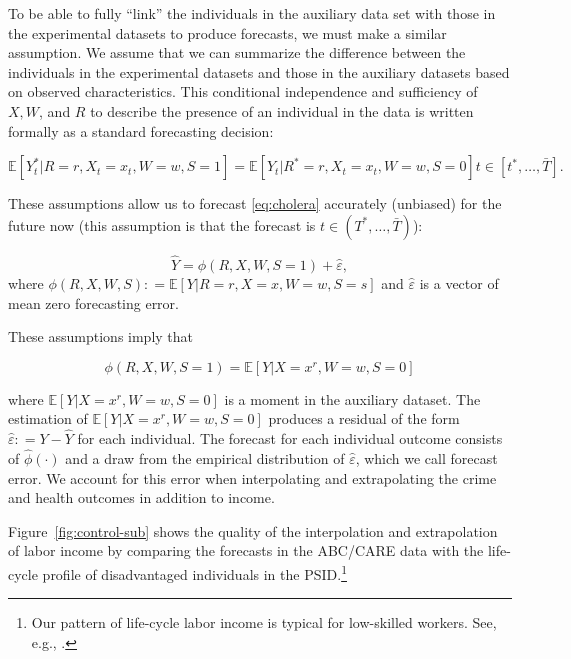 To be able to fully ``link'' the individuals in the auxiliary data set with those in the experimental datasets to produce forecasts, we must make a similar assumption. We assume that we can summarize the difference between the individuals in the experimental datasets and those in the auxiliary datasets based on observed characteristics. This conditional independence and sufficiency of $X, W$, and $R$ to describe the presence of an individual in the data is written formally as a standard forecasting decision:

\begin{equation}
\mathbb{E} \left[ Y^*_t | R = r, X_t = x_t, W = w, S = 1 \right] = \mathbb{E} \left[ Y_t | R^* = r , X_t = x_t, W = w, S = 0\right] t \in \left[t^{\ast},\dots,\bar{T}\right].
\end{equation}

These assumptions allow us to forecast \eqref{eq:cholera} accurately (unbiased) for the future now (this assumption is that the forecast is $t\in(T^{\ast},\dots,\bar{T})$):

\begin{equation}
\widehat{Y} = \widehat{\phi} \left( R, X, W, S = 1 \right) + \widehat{\varepsilon},   \label{eq:additive}
\end{equation}
where $\phi \left( R, X, W, S \right) : = \mathbb{E} \left[ Y | R = r, X = x, W = w, S = s \right] $ and $\widehat{\varepsilon}$ is a vector of mean zero forecasting error.

These assumptions imply that

\begin{equation}
\phi \left( R, X, W, S = 1 \right) = \mathbb{E} \left[ Y | X = x^r, W = w, S = 0 \right]
\end{equation}

\noindent where $\mathbb{E} \left[ Y | X = x^r, W = w, S = 0 \right]$ is a moment in the auxiliary dataset. The estimation of $\mathbb{E} \left[ Y | X = x^r, W = w, S = 0 \right]$ produces a residual of the form $\widehat{\varepsilon} : = Y - \widehat{Y}$ for each individual. The forecast for each  individual outcome consists of $\widehat{\phi} \left( \cdot \right)$ and a draw from the empirical distribution of $\widehat{\varepsilon}$, which we call forecast error. We account for this error when interpolating and extrapolating the crime and health outcomes in addition to income.

Figure~\ref{fig:control-sub} shows the quality of the interpolation and extrapolation of labor income by comparing the forecasts in the ABC/CARE data with the life-cycle profile of disadvantaged individuals in the PSID.\footnote{Our pattern of life-cycle labor income is typical for low-skilled workers. See, e.g., \cite{Blundell-etal_2015_J-Pub-E}.}

